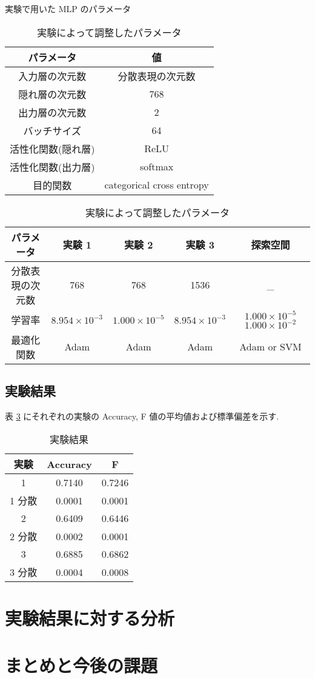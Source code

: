 \documentclass[twocolumn]{jarticle}     %
\begin{document}
\begin{table}[t] %
	\begin{center}
		\caption{実験で用いた MLP のパラメータ}
		\label{mlph}
		\small
		\begin{tabular}{|c|c|} \hline
			パラメータ			& 値						\\ \hline \hline
			入力層の次元数			& 分散表現の次元数 \\ \hline
			隠れ層の次元数      	& 768				\\ \hline
			出力層の次元数			& 2 						\\ \hline
			バッチサイズ			& 64 						\\ \hline
			活性化関数(隠れ層)		& ReLU 					\\ \hline
			活性化関数(出力層)		& softmax 				\\ \hline
			目的関数				& categorical cross entropy 	\\ \hline
		\end{tabular}
	\end{center}
	\begin{center}
		\caption{実験によって調整したパラメータ}
		\label{optu1}
		\small
		\begin{tabular}{|c|c|c|c|c|} \hline
            パラメータ			 & 実験 1 & 実験 2 & 実験 3 &探索空間 \\ \hline \hline
            分散表現の次元数    & 768 & 768 & 1536 & _ \\ \hline
			学習率				& $8.954 \times 10^{-3}$ & $1.000 \times 10^{-5}$& $8.954 \times 10^{-3}$ & $1.000 \times 10^{-5}$  $1.000 \times 10^{-2}$  \\ \hline
			最適化関数			& Adam & Adam & Adam &Adam or SVM \\ \hline
		\end{tabular}
	\end{center}

\end{table}

\subsection{実験結果}
表 \ref{result123} にそれぞれの実験の Accuracy, F 値の平均値および標準偏差を示す. 
\begin{table}[ht] %
	\begin{center}
		\caption{実験結果}
		\label{result123}
		\begin{tabular}{|c|c|c|}
			\hline
			実験 &Accuracy& F \\ \hline \hline
			1  & 0.7140 & 0.7246  \\ \hline
			1 分散 & 0.0001 & 0.0001  \\ \hline
			2  & 0.6409 & 0.6446 \\ \hline
			2 分散 & 0.0002 & 0.0001  \\ \hline
			3  & 0.6885 & 0.6862\\ \hline
			3 分散 & 0.0004 & 0.0008  \\ \hline
		\end{tabular}
	\end{center}
\end{table}
\section{実験結果に対する分析}
\section{まとめと今後の課題} 


\end{document}
